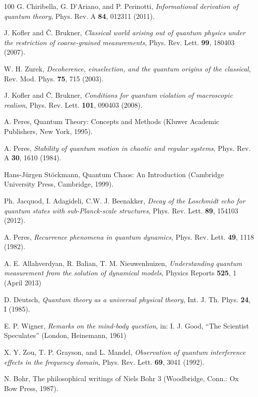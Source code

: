 \documentclass[12pt]{article}
\begin{document}
\begin {thebibliography}{100}
 G. Chiribella, G. D'Ariano, and P. Perinotti, {\it Informational derivation of quantum theory}, Phys. Rev. A {\bf 84}, 012311 (2011).

 J. Kofler and {\v C}. Brukner, {\it Classical world arising out of quantum physics under the restriction of coarse-grained measurements}, Phys. Rev. Lett. {\bf 99}, 180403 (2007).

 W. H. Zurek, {\it Decoherence, einselection, and the quantum origins of the classical}, Rev. Mod. Phys. {\bf 75}, 715 (2003).


 J. Kofler and {\v C}. Brukner, {\it Conditions for quantum violation of macroscopic realism}, Phys. Rev. Lett. {\bf 101}, 090403 (2008).

 A. Peres, Quantum Theory: Concepts and Methods (Kluwer Academic Publishers, New York, 1995).

 A. Peres, {\it Stability of quantum motion in chaotic and regular systems}, Phys. Rev. A {\bf 30}, 1610 (1984).

 Hans-J{\"u}rgen St{\"o}ckmann, Quantum Chaos: An Introduction (Cambridge University Press, Cambridge, 1999).

 Ph. Jacquod, I. Adagideli, C.W. J. Beenakker, {\it Decay of the Loschmidt echo for quantum states with sub-Planck-scale structures}, Phys. Rev. Lett. {\bf 89}, 154103 (2012). 

 A. Peres, {\it Recurrence phenomena in quantum dynamics}, Phys. Rev. Lett. {\bf 49}, 1118 (1982).

 A. E. Allahverdyan, R. Balian, T. M. Nieuwenhuizen,
{\it Understanding quantum measurement from the solution of dynamical models}, Physics Reports {\bf 525}, 1 (April 2013)

 D. Deutsch, {\it Quantum theory as a universal physical theory}, Int. J. Th. Phys. {\bf 24}, I  (1985).

 E. P. Wigner, {\it Remarks on the mind-body question}, in: I. J. Good, ``The Scientist Speculates'' (London, Heinemann, 1961)

 X. Y. Zou, T. P. Grayson, and L. Mandel, {\it Observation of quantum interference effects in the frequency domain}, Phys. Rev. Lett. {\bf 69}, 3041 (1992).

 N. Bohr, The philosophical writings of Niels Bohr 3 (Woodbridge, Conn.: Ox Bow Press, 1987).


\end{thebibliography}
\end{document}
